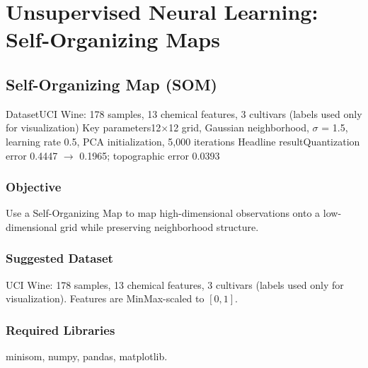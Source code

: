 
\part{Unsupervised Neural Learning: Self-Organizing Maps}

\chapter{Self-Organizing Map (SOM)}\label{exp:15}


\quickfacts
  {Dataset}{UCI Wine: 178 samples, 13 chemical features, 3 cultivars (labels used only for visualization)}
  {Key parameters}{12$\times$12 grid, Gaussian neighborhood, $\sigma$ = 1.5, learning rate 0.5, PCA initialization, 5,000 iterations}
  {Headline result}{Quantization error 0.4447 $\rightarrow$ 0.1965; topographic error 0.0393}

\section{Objective}
Use a Self-Organizing Map to map high-dimensional observations onto a low-dimensional grid
while preserving neighborhood structure.

\section{Suggested Dataset}
UCI Wine: 178 samples, 13 chemical features, 3 cultivars (labels used only for
visualization). Features are MinMax-scaled to $[0, 1]$.

\section{Required Libraries}
minisom, numpy, pandas, matplotlib.


